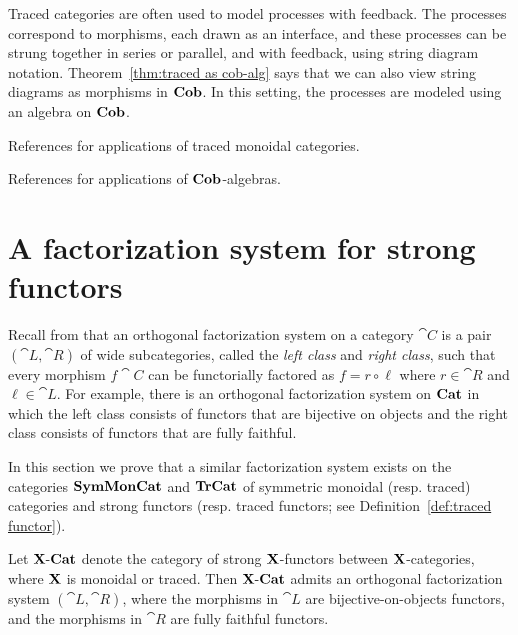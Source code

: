 \documentclass[12pt,oneside,article,draft]{memoir}
\begin{document}
Traced categories are often used to model processes with feedback. The processes correspond to morphisms, each drawn as an interface, and these processes can be strung together in series or parallel, and with feedback, using string diagram notation. Theorem~\ref{thm:traced as cob-alg} says that we can also view string diagrams as morphisms in $\mathbf{Cob}$. In this setting, the processes are modeled using an algebra on $\mathbf{Cob}$.

References for applications of traced monoidal categories.

References for applications of $\mathbf{Cob}$-algebras.

\section{A factorization system for strong functors}

Recall from \cite{} that an orthogonal factorization system on a category $\cat{C}$ is a pair $(\cat{L},\cat{R})$ of wide subcategories, called the \emph{left class} and \emph{right class}, such that every morphism $f\cat{C}$ can be functorially factored as $f=r\circ\ell$ where $r\in\cat{R}$ and $\ell\in\cat{L}$. For example, there is an orthogonal factorization system on $\mathbf{Cat}$ in which the left class consists of functors that are bijective on objects and the right class consists of functors that are fully faithful. 

In this section we prove that a similar factorization system exists on the categories $\mathbf{SymMonCat}$ and $\mathbf{TrCat}$ of symmetric monoidal (resp. traced) categories and strong functors (resp. traced functors; see Definition~\ref{def:traced functor}).  

\begin{lemma}\label{lemma:factorization system}

Let $\textnormal{$\mathbf{X}$-$\mathbf{Cat}$}$ denote the category of strong $\mathbf{X}$-functors between $\mathbf{X}$-categories,  where $\mathbf{X}$ is monoidal or traced. Then $\textnormal{$\mathbf{X}$-$\mathbf{Cat}$}$ admits an orthogonal factorization system $(\cat{L},\cat{R})$, where the morphisms in $\cat{L}$ are bijective-on-objects functors, and the morphisms in $\cat{R}$ are fully faithful functors.

\end{lemma}
\end{document}
